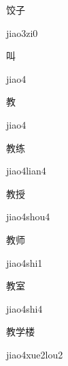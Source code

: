 \begin{multicols*}{2}
\begin{verbete}[jiao3zi0]{饺子}
\begin{pronuncia}{jiao3zi0}
\end{pronuncia}
\end{verbete}

\begin{verbete}[jiao4]{叫}
\begin{pronuncia}{jiao4}
\end{pronuncia}
\end{verbete}

\begin{verbete}[jiao4]{教}
\begin{pronuncia}{jiao4}
\end{pronuncia}
\end{verbete}

\begin{verbete}{教练}
\begin{pronuncia}{jiao4lian4}
\end{pronuncia}
\end{verbete}

\begin{verbete}{教授}
\begin{pronuncia}jiao4shou4{}
\end{pronuncia}
\end{verbete}

\begin{verbete}{教师}
\begin{pronuncia}{jiao4shi1}
\end{pronuncia}
\end{verbete}

\begin{verbete}{教室}
\begin{pronuncia}{jiao4shi4}
\end{pronuncia}
\end{verbete}

\begin{verbete}{教学楼}
\begin{pronuncia}{jiao4xue2lou2}
\end{pronuncia}
\end{verbete}


\end{multicols*}
